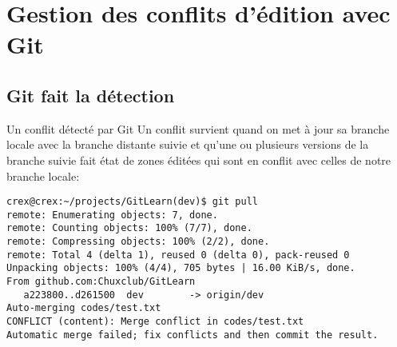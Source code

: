 \documentclass{beamer}
\begin{document}

\section{Gestion des conflits d'édition avec Git}


\subsection{Git fait la détection}

\begin{frame}[fragile]{Un conflit détecté par Git}
Un conflit survient quand on met à jour sa branche locale avec la branche distante suivie et qu'une ou plusieurs versions de la branche suivie fait état de zones éditées qui sont en conflit avec celles de notre branche locale:
\begin{mdframed}[style=Bash]
\begin{lstlisting}[style=Bash, caption={Exemple de détection automatique de conflit d'édition}]
crex@crex:~/projects/GitLearn(dev)$ git pull
remote: Enumerating objects: 7, done.
remote: Counting objects: 100% (7/7), done.
remote: Compressing objects: 100% (2/2), done.
remote: Total 4 (delta 1), reused 0 (delta 0), pack-reused 0
Unpacking objects: 100% (4/4), 705 bytes | 16.00 KiB/s, done.
From github.com:Chuxclub/GitLearn
   a223800..d261500  dev        -> origin/dev
Auto-merging codes/test.txt
CONFLICT (content): Merge conflict in codes/test.txt
Automatic merge failed; fix conflicts and then commit the result.
\end{lstlisting}
\end{mdframed}
\end{frame}
\end{document}
